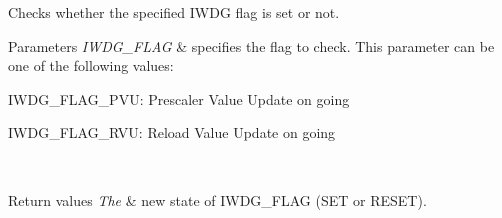 Checks whether the specified I\+W\+D\+G flag is set or not. 


\begin{DoxyParams}{Parameters}
{\em I\+W\+D\+G\+\_\+\+F\+L\+A\+G} & specifies the flag to check. This parameter can be one of the following values\+: \begin{DoxyItemize}
\item I\+W\+D\+G\+\_\+\+F\+L\+A\+G\+\_\+\+P\+V\+U\+: Prescaler Value Update on going \item I\+W\+D\+G\+\_\+\+F\+L\+A\+G\+\_\+\+R\+V\+U\+: Reload Value Update on going \end{DoxyItemize}
\\
\hline
\end{DoxyParams}

\begin{DoxyRetVals}{Return values}
{\em The} & new state of I\+W\+D\+G\+\_\+\+F\+L\+A\+G (S\+E\+T or R\+E\+S\+E\+T). \\
\hline
\end{DoxyRetVals}
